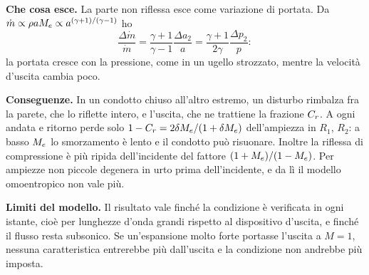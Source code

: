 \textbf{Che cosa esce.} La parte non riflessa esce come variazione di portata. Da
$\dot m\propto\rho aM_e\propto a^{(\gamma+1)/(\gamma-1)}$ ho
\[
  \frac{\Delta\dot m}{\dot m}=\frac{\gamma+1}{\gamma-1}\frac{\Delta a_2}{a}=\frac{\gamma+1}{2\gamma}\frac{\Delta p_2}{p}:
\]
la portata cresce con la pressione, come in un ugello strozzato, mentre la velocità d'uscita cambia poco.

\textbf{Conseguenze.} In un condotto chiuso all'altro estremo, un disturbo rimbalza fra la parete, che lo riflette
intero, e l'uscita, che ne trattiene la frazione $C_r$. A ogni andata e ritorno perde solo
$1-C_r=2\delta M_e/(1+\delta M_e)$ dell'ampiezza in $R_1$, $R_2$: a basso $M_e$ lo smorzamento è lento e il condotto può
risuonare. Inoltre la riflessa di compressione è più ripida dell'incidente del fattore $(1+M_e)/(1-M_e)$. Per
ampiezze non piccole degenera in urto prima dell'incidente, e da lì il modello omoentropico non vale più.

\textbf{Limiti del modello.} Il risultato vale finché la condizione è verificata in ogni istante, cioè per
lunghezze d'onda grandi rispetto al dispositivo d'uscita, e finché il flusso resta subsonico. Se un'espansione molto
forte portasse l'uscita a $M=1$, nessuna caratteristica entrerebbe più dall'uscita e la condizione non andrebbe più
imposta.


